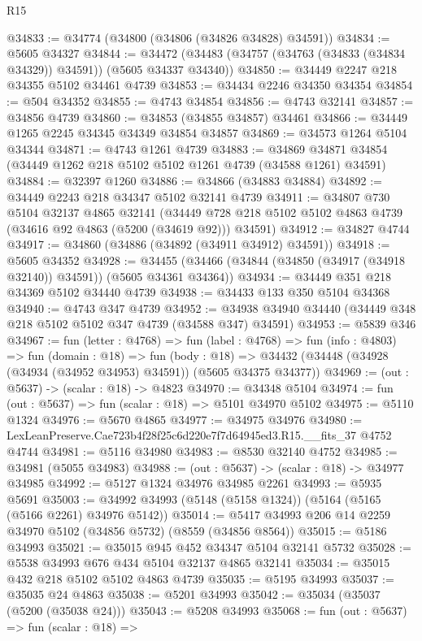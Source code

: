 \begin{lexlean}{R15}
\begin{coremodule}
{{{{{{{{{{{@34833 := @34774 (@34800 (@34806 (@34826 @34828) @34591))
@34834 := @5605 @34327
@34844 := @34472 (@34483 (@34757 (@34763 (@34833 (@34834 @34329)) @34591)) (@5605 @34337 @34340))
@34850 := @34449 @2247 @218 @34355 @5102 @34461 @4739
@34853 := @34434 @2246 @34350 @34354
@34854 := @504 @34352
@34855 := @4743 @34854
@34856 := @4743 @32141
@34857 := @34856 @4739
@34860 := @34853 (@34855 @34857) @34461
@34866 := @34449 @1265 @2245 @34345 @34349 @34854 @34857
@34869 := @34573 @1264 @5104 @34344
@34871 := @4743 @1261 @4739
@34883 := @34869 @34871 @34854 (@34449 @1262 @218 @5102 @5102 @1261 @4739 (@34588 @1261) @34591)
@34884 := @32397 @1260
@34886 := @34866 (@34883 @34884)
@34892 := @34449 @2243 @218 @34347 @5102 @32141 @4739
@34911 := @34807
    @730
    @5104
    @32137
    @4865
    @32141
    (@34449 @728 @218 @5102 @5102 @4863 @4739 (@34616 @92 @4863 (@5200 (@34619 @92))) @34591)
@34912 := @34827 @4744
@34917 := @34860 (@34886 (@34892 (@34911 @34912) @34591))
@34918 := @5605 @34352
@34928 := @34455 (@34466 (@34844 (@34850 (@34917 (@34918 @32140)) @34591)) (@5605 @34361 @34364))
@34934 := @34449 @351 @218 @34369 @5102 @34440 @4739
@34938 := @34433 @133 @350 @5104 @34368
@34940 := @4743 @347 @4739
@34952 := @34938 @34940 @34440 (@34449 @348 @218 @5102 @5102 @347 @4739 (@34588 @347) @34591)
@34953 := @5839 @346
@34967 := fun (letter : @4768) =>
  fun (label : @4768) =>
  fun (info : @4803) =>
  fun (domain : @18) =>
  fun (body : @18) => @34432 (@34448 (@34928 (@34934 (@34952 @34953) @34591)) (@5605 @34375 @34377))
@34969 := (out : @5637) -> (scalar : @18) -> @4823
@34970 := @34348 @5104
@34974 := fun (out : @5637) => fun (scalar : @18) => @5101 @34970 @5102
@34975 := @5110 @1324
@34976 := @5670 @4865
@34977 := @34975 @34976
@34980 := LexLeanPreserve.Cae723b4f28f25c6d220e7f7d64945ed3.R15.__fits_37 @4752 @4744
@34981 := @5116 @34980
@34983 := @8530 @32140 @4752
@34985 := @34981 (@5055 @34983)
@34988 := (out : @5637) -> (scalar : @18) -> @34977 @34985
@34992 := @5127 @1324 @34976 @34985 @2261
@34993 := @5935 @5691
@35003 := @34992 @34993 (@5148 (@5158 @1324)) (@5164 (@5165 (@5166 @2261) @34976 @5142))
@35014 := @5417 @34993 @206 @14 @2259 @34970 @5102 (@34856 @5732) (@8559 (@34856 @8564))
@35015 := @5186 @34993
@35021 := @35015 @945 @452 @34347 @5104 @32141 @5732
@35028 := @5538 @34993 @676 @434 @5104 @32137 @4865 @32141
@35034 := @35015 @432 @218 @5102 @5102 @4863 @4739
@35035 := @5195 @34993
@35037 := @35035 @24 @4863
@35038 := @5201 @34993
@35042 := @35034 (@35037 (@5200 (@35038 @24)))
@35043 := @5208 @34993
@35068 := fun (out : @5637) =>
  fun (scalar : @18) =>
}}}}}}}}}}}
\end{coremodule}
\end{lexlean}
